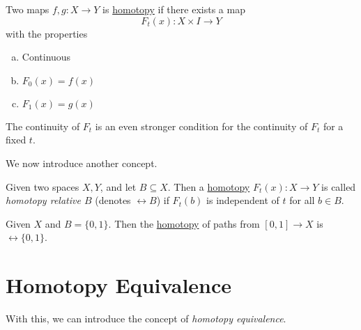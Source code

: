 \begin{prev}
	Two maps \(f, g\colon X\to Y\) is \hyperref[def:homotopy]{homotopy} if there exists a map
	\[
		F_t(x)\colon X\times I\to Y
	\]
	with the properties
	\begin{enumerate}[(a)]
		\item Continuous
		\item \(F_0(x) = f(x)\)
		\item \(F_1(x) = g(x)\)
	\end{enumerate}
	\begin{remark}
		The continuity of \(F_t\) is an even stronger condition for the continuity of \(F_t\) for a fixed \(t\).
	\end{remark}
\end{prev}

We now introduce another concept.
\begin{definition}\label{def:homotopy-relative}
	Given two spaces \(X, Y\), and let \(B\subseteq X\). Then a \hyperref[def:homotopy]{homotopy} \(F_t(x)\colon X\to Y\) is called \emph{homotopy relative \(B\)} (denotes \(\rel B\)) if \(F_t(b)\) is independent of \(t\) for all \(b\in B\).
\end{definition}

\begin{eg}
	Given \(X\) and \(B = \{0, 1\}\). Then the \hyperref[def:homotopy]{homotopy} of paths from \([0, 1]\to X\) is \(\rel \{0, 1\}\).
	\begin{center}
	\end{center}
\end{eg}

\section{Homotopy Equivalence}
With this, we can introduce the concept of \emph{homotopy equivalence}.

